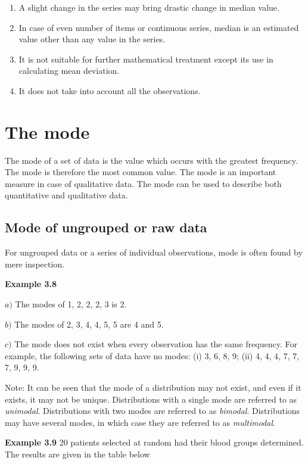 \documentclass[
]{book}
\begin{document}
\begin{enumerate}
\def\labelenumi{\arabic{enumi}.}
\item
  A slight change in the series may bring drastic change in median
  value.
\item
  In case of even number of items or continuous series, median is an
  estimated value other than any value in the series.
\item
  It is not suitable for further mathematical treatment except its use
  in calculating mean deviation.
\item
  It does not take into account all the observations.
\end{enumerate}

\hypertarget{the-mode}{%
\section{The mode}\label{the-mode}}

The mode of a set of data is the value which occurs with the greatest
frequency. The mode is therefore the most common value. The mode is an
important measure in case of qualitative data. The mode can be used to
describe both quantitative and qualitative data.

\hypertarget{mode-of-ungrouped-or-raw-data}{%
\subsection{Mode of ungrouped or raw data}\label{mode-of-ungrouped-or-raw-data}}

For ungrouped data or a series of individual observations, mode is often
found by mere inspection.

\textbf{Example 3.8}

\(a)\) The modes of 1, 2, 2, 2, 3 is 2.

\(b)\) The modes of 2, 3, 4, 4, 5, 5 are 4 and 5.

\(c)\) The mode does not exist when every observation has the same
frequency. For example, the following sets of data have no modes: (i) 3,
6, 8, 9; (ii) 4, 4, 4, 7, 7, 7, 9, 9, 9.

Note: It can be seen that the mode of a distribution may not exist, and
even if it exists, it may not be unique. Distributions with a single
mode are referred to as \emph{unimodal}. Distributions with two modes are
referred to as \emph{bimodal}. Distributions may have several modes, in which
case they are referred to as \emph{multimodal}.

\textbf{Example 3.9} 20 patients selected at random had their blood groups
determined. The results are given in the table below
\end{document}
